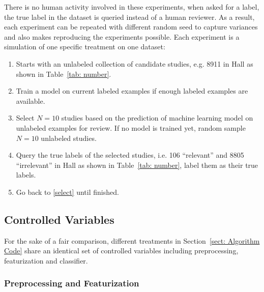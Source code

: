 \documentclass{svjour3}
\theoremstyle{break}
\begin{document}
There is no human activity involved in these experiments, when asked for a label, the true label in the dataset is queried instead of a human reviewer. As a result, each experiment can be repeated with different random seed to capture variances and also makes reproducing the experiments possible. Each experiment is a simulation of one specific treatment on one dataset:

\begin{enumerate}
\item
Starts with an unlabeled collection of candidate studies, e.g. 8911 in Hall as shown in Table~\ref{tab: number}.

\item
\label{select}
Train a model on current labeled examples if enough labeled examples are available.

\item
Select $N=10$ studies based on the prediction of machine learning model on unlabeled examples for review. If no model is trained yet, random sample $N=10$ unlabeled studies.

\item
Query the true labels of the selected studies, i.e. 106 ``relevant'' and 8805 ``irrelevant'' in Hall as shown in Table~\ref{tab: number}, label them as their true labels.

\item
Go back to \ref{select} until finished.

\end{enumerate}


\subsection{Controlled Variables}
\label{subsect: Controlled Variables}

For the sake of a fair comparison, different treatments in Section~\ref{sect: Algorithm Code} share an identical set of controlled variables including preprocessing, featurization and classifier. 

\subsubsection{Preprocessing and Featurization}
\end{document}
